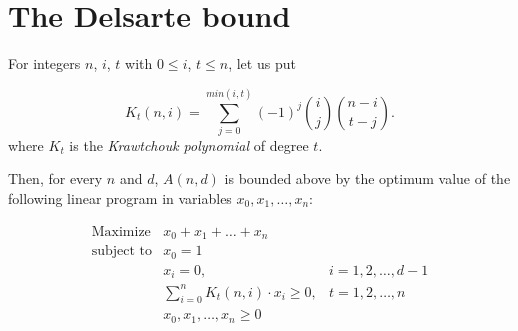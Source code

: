 \section{The Delsarte bound}
\begin{theorem}
    For integers $n$, $i$, $t$ with $0 \leq i$, $t \leq n$, let us put

    \begin{equation}
        K_t(n,i) = \sum_{j=0}^{min(i,t)}(-1)^j{i \choose j}{n - i \choose t - j}.
    \end{equation}
    where $K_t$ is the \emph{Krawtchouk polynomial} of degree $t$.

    Then, for every $n$ and $d$, $A(n,d)$ is bounded above by the optimum value of the following linear program in variables $x_0, x_1, \ldots, x_n$:

    \begin{equation}
        \begin{array}{lll}
            \text{Maximize}   & x_0 + x_1 + \ldots + x_n                       &                  \\
            \text{subject to} & x_0 = 1                                        &                  \\
                              & x_i = 0,                                       & i=1,2,\ldots,d-1 \\
                              & \sum\limits_{i=0}^{n}K_t(n,i) \cdot x_i \geq 0, & t=1,2,\ldots,n   \\
                              & x_0, x_1, \ldots, x_n \geq 0                   &                  \\
        \end{array}
    \end{equation}
\end{theorem}

\begin{example}
\end{example}
